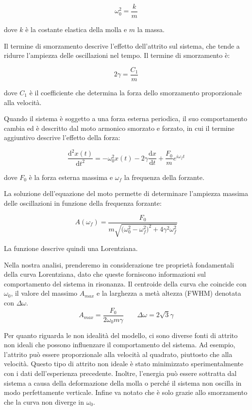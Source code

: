 \documentclass[12pt]{article}
\begin{document}
\[
  \omega_0^2=\frac{k}{m}
\]

dove $k$ è la costante elastica della molla e $m$ la massa.

Il termine di smorzamento descrive l'effetto dell'attrito sul sistema, che tende a ridurre l'ampiezza delle oscillazioni nel tempo. Il termine di smorzamento è:

\[
  2\gamma=\frac{C_1}{m}
\]

dove $C_1$ è il coefficiente che determina la forza dello smorzamento proporzionale alla velocità.

Quando il sistema è soggetto a una forza esterna periodica, il suo comportamento cambia ed è descritto dal moto armonico smorzato e forzato, in cui il termine aggiuntivo descrive l'effetto della forza:

\[
  {\frac{\mathrm{d^2}x(t)}{\mathrm{d}t^2}}=-\omega_0^2x(t)-2\gamma\frac{\mathrm{d} x}{\mathrm{d}t}+\frac{F_0}{m}e^{i\omega_ft}
\]

dove $F_0$ è la forza esterna massima e $\omega_f$ la frequenza della forzante.

La soluzione dell'equazione del moto permette di determinare l'ampiezza massima delle oscillazioni in funzione della frequenza forzante:

\[
  A(\omega_f)=\frac{F_0}{m\sqrt{\bigg(\omega_0^2-\omega_f^2\bigg)^2+4\gamma^2\omega_f^2}}
\]

La funzione descrive quindi una Lorentziana.

Nella nostra analisi, prenderemo in considerazione tre proprietà fondamentali della curva Lorentziana, dato che queste forniscono informazioni sul comportamento del sistema in risonanza.
Il centroide della curva che coincide con $\omega_0$, il valore del massimo $A_{max}$ e la larghezza a metà altezza (FWHM) denotata con $\Delta \omega$.
\[
  A_{max}=\frac{F_0}{2\omega_0m\gamma} \qquad \Delta \omega=2\sqrt3\gamma
\]

Per quanto riguarda le non idealità del modello, ci sono diverse fonti di attrito non ideali che possono influenzare il comportamento del sistema. Ad esempio, l'attrito può essere proporzionale alla velocità al quadrato, piuttosto che alla velocità. Questo tipo di attrito non ideale è stato minimizzato sperimentalmente con i dati dell'esperienza precedente. Inoltre, l'energia può essere sottratta dal sistema a causa della deformazione della molla o perché il sistema non oscilla in modo perfettamente verticale.
Infine va notato che è solo grazie allo smorzamento che la curva non diverge in $\omega_0$.
\end{document}
